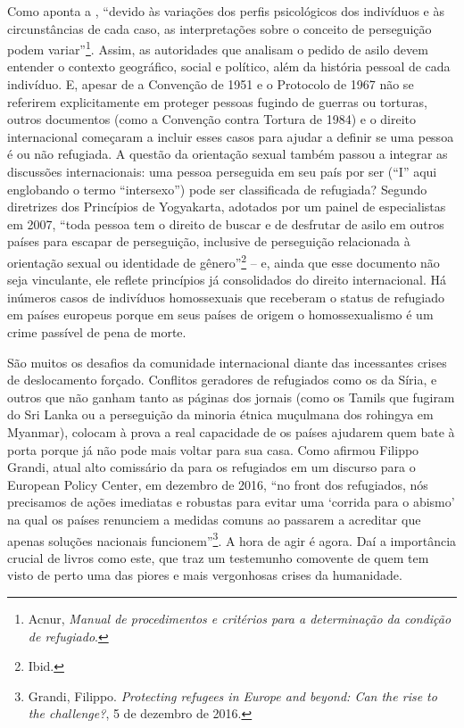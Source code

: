 Como aponta a , ``devido às variações dos perfis psicológicos dos
indivíduos e às circunstâncias de cada caso, as interpretações sobre o
conceito de perseguição podem variar''\footnote{Acnur,
  \emph{Manual de procedimentos e critérios para a determinação da
  condição de refugiado}.}. Assim, as autoridades que
analisam o pedido de asilo devem entender o contexto geográfico, social
e político, além da história pessoal de cada indivíduo. E, apesar de a
Convenção de 1951 e o Protocolo de 1967 não se referirem explicitamente
em proteger pessoas fugindo de guerras ou torturas, outros documentos
(como a Convenção contra Tortura de 1984) e o direito internacional
começaram a incluir esses casos para ajudar a definir se uma pessoa é ou
não refugiada. A questão da orientação sexual também passou a integrar
as discussões internacionais: uma pessoa perseguida em seu país por ser
 (``I'' aqui englobando o termo ``intersexo'') pode ser
classificada de refugiada? Segundo diretrizes dos Princípios de
Yogyakarta, adotados por um painel de especialistas em 2007, ``toda
pessoa tem o direito de buscar e de desfrutar de asilo em outros países
para escapar de perseguição, inclusive de perseguição relacionada à
orientação sexual ou identidade de gênero''\footnote{Ibid.}  
-- e, ainda que esse
documento não seja vinculante, ele reflete princípios já consolidados do
direito internacional. Há inúmeros casos de indivíduos homossexuais que
receberam o status de refugiado em países europeus porque em seus países
de origem o homossexualismo é um crime passível de pena de morte.

São muitos os desafios da comunidade internacional diante das
incessantes crises de deslocamento forçado. Conflitos geradores de
refugiados como os da Síria, e outros que não ganham tanto as páginas
dos jornais (como os Tamils que fugiram do Sri Lanka ou a perseguição da
minoria étnica muçulmana dos rohingya em Myanmar), colocam à prova a real
capacidade de os países ajudarem quem bate à porta porque já não pode
mais voltar para sua casa. Como afirmou Filippo Grandi, atual alto
comissário da  para os refugiados em um discurso para o European
Policy Center, em dezembro de 2016, ``no front dos refugiados, nós
precisamos de ações imediatas e robustas para evitar uma `corrida para o
abismo' na qual os países renunciem a medidas comuns ao passarem a
acreditar que apenas soluções nacionais funcionem''\footnote{Grandi,
  Filippo. \emph{Protecting refugees in Europe and beyond: Can the 
  rise to the challenge?}, 5 de dezembro de 2016.}. A hora de agir
é agora. Daí a importância crucial de livros como este, que traz um
testemunho comovente de quem tem visto de perto uma das piores e mais
vergonhosas crises da humanidade.

